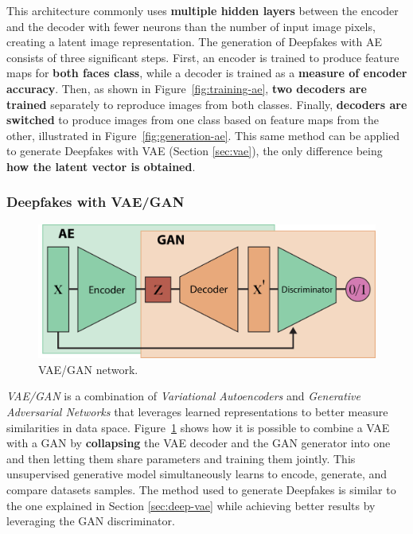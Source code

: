 \documentclass[preprint]{elsarticle}
\begin{document}
This architecture commonly uses \textbf{multiple hidden layers} between the encoder and the decoder 
with fewer neurons than the number of input image pixels, creating a latent image representation. 
The generation of Deepfakes with AE consists of three significant steps.
First, an encoder is trained to produce feature maps for \textbf{both faces class}, while a decoder is trained as a \textbf{measure of encoder accuracy}. 
Then, as shown in Figure~\ref{fig:training-ae}, \textbf{two decoders are trained} separately to reproduce images from both classes. Finally, \textbf{decoders are switched} to produce
images from one class based on feature maps from the other, illustrated in Figure~\ref{fig:generation-ae}.
This same method can be applied to generate Deepfakes with VAE (Section \ref{sec:vae}), the only difference being \textbf{how the latent vector is obtained}.

\subsubsection{Deepfakes with VAE/GAN}

\begin{figure}[b]
	\centering
    \includegraphics[scale=0.75]{img/svg/VaeGan.png}
	\caption{VAE/GAN network.}\label{fig:vae-gan}
\end{figure}


\emph{VAE/GAN} \cite{larsen2016autoencoding} is a combination of \emph{Variational Autoencoders} and \emph{Generative Adversarial Networks}
that leverages learned representations to better measure similarities in data space.
Figure~\ref{fig:vae-gan} shows how it is possible to combine a VAE with a GAN by \textbf{collapsing} the VAE decoder and the GAN generator 
into one and then letting them share parameters and training them jointly.
This unsupervised generative model simultaneously learns to encode, generate, and compare datasets samples. 
The method used to generate Deepfakes is similar to the one explained in Section \ref{sec:deep-vae} while achieving 
better results by leveraging the GAN discriminator.
\end{document}
